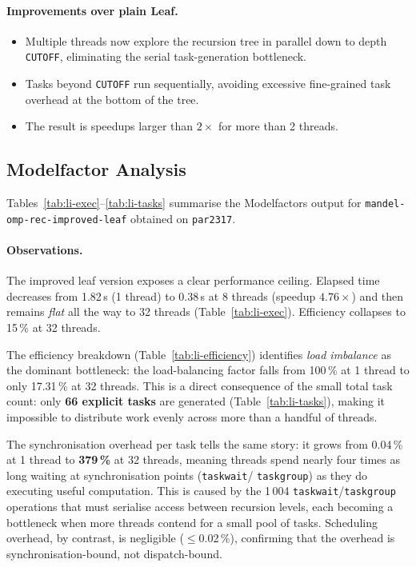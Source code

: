 \paragraph{Improvements over plain Leaf.}
\begin{itemize}
    \item Multiple threads now explore the recursion tree in parallel down to depth
          \texttt{CUTOFF}, eliminating the serial task-generation bottleneck.
    \item Tasks beyond \texttt{CUTOFF} run sequentially, avoiding excessive fine-grained
          task overhead at the bottom of the tree.
    \item The result is speedups larger than $2\times$ for more than 2 threads.
\end{itemize}

\subsection{Modelfactor Analysis}
\label{sec:rec-improved-mf}

Tables~\ref{tab:li-exec}--\ref{tab:li-tasks} summarise the Modelfactors output for
\texttt{mandel-omp-rec-improved-leaf} obtained on \texttt{par2317}.







\paragraph{Observations.}
The improved leaf version exposes a clear performance ceiling.
Elapsed time decreases from 1.82\,s (1 thread) to 0.38\,s at 8 threads
(speedup $4.76\times$) and then remains \emph{flat} all the way to 32 threads
(Table~\ref{tab:li-exec}).
Efficiency collapses to 15\,\% at 32 threads.

The efficiency breakdown (Table~\ref{tab:li-efficiency}) identifies \emph{load
imbalance} as the dominant bottleneck: the load-balancing factor falls from 100\,\% at
1 thread to only 17.31\,\% at 32 threads.
This is a direct consequence of the small total task count: only \textbf{66 explicit
tasks} are generated (Table~\ref{tab:li-tasks}), making it impossible to distribute
work evenly across more than a handful of threads.

The synchronisation overhead per task tells the same story:
it grows from 0.04\,\% at 1 thread to \textbf{379\,\%} at 32 threads, meaning threads
spend nearly four times as long waiting at synchronisation points (\texttt{taskwait}/
\texttt{taskgroup}) as they do executing useful computation.
This is caused by the 1\,004 \texttt{taskwait}/\texttt{taskgroup} operations that must
serialise access between recursion levels, each becoming a bottleneck when more threads
contend for a small pool of tasks.
Scheduling overhead, by contrast, is negligible ($\leq$0.02\,\%), confirming that the
overhead is synchronisation-bound, not dispatch-bound.


